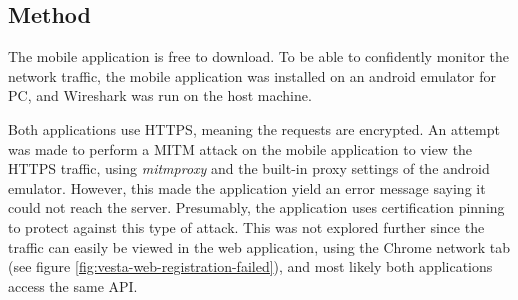 \subsection{Method}
The mobile application is free to download. To be able to confidently monitor the network traffic, the mobile application was installed on an android emulator for PC, and Wireshark was run on the host machine.

Both applications use HTTPS, meaning the requests are encrypted. An attempt was made to perform a \gls{MITM} attack on the mobile application to view the HTTPS traffic, using \textit{mitmproxy} and the built-in proxy settings of the android emulator. However, this made the application yield an error message saying it could not reach the server. Presumably, the application uses certification pinning to protect against this type of attack. This was not explored further since the traffic can easily be viewed in the web application, using the Chrome network tab (see figure \ref{fig:vesta-web-registration-failed}), and most likely both applications access the same API.

